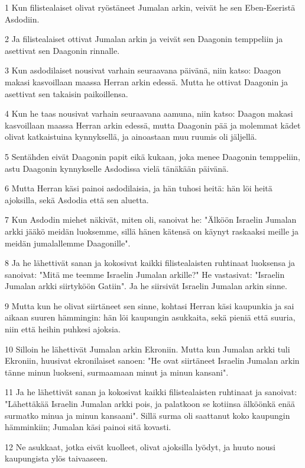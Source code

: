 \par 1 Kun filistealaiset olivat ryöstäneet Jumalan arkin, veivät he sen Eben-Eseristä Asdodiin.
\par 2 Ja filistealaiset ottivat Jumalan arkin ja veivät sen Daagonin temppeliin ja asettivat sen Daagonin rinnalle.
\par 3 Kun asdodilaiset nousivat varhain seuraavana päivänä, niin katso: Daagon makasi kasvoillaan maassa Herran arkin edessä. Mutta he ottivat Daagonin ja asettivat sen takaisin paikoillensa.
\par 4 Kun he taas nousivat varhain seuraavana aamuna, niin katso: Daagon makasi kasvoillaan maassa Herran arkin edessä, mutta Daagonin pää ja molemmat kädet olivat katkaistuina kynnyksellä, ja ainoastaan muu ruumis oli jäljellä.
\par 5 Sentähden eivät Daagonin papit eikä kukaan, joka menee Daagonin temppeliin, astu Daagonin kynnykselle Asdodissa vielä tänäkään päivänä.
\par 6 Mutta Herran käsi painoi asdodilaisia, ja hän tuhosi heitä: hän löi heitä ajoksilla, sekä Asdodia että sen aluetta.
\par 7 Kun Asdodin miehet näkivät, miten oli, sanoivat he: "Älköön Israelin Jumalan arkki jääkö meidän luoksemme, sillä hänen kätensä on käynyt raskaaksi meille ja meidän jumalallemme Daagonille".
\par 8 Ja he lähettivät sanan ja kokosivat kaikki filistealaisten ruhtinaat luoksensa ja sanoivat: "Mitä me teemme Israelin Jumalan arkille?" He vastasivat: "Israelin Jumalan arkki siirtyköön Gatiin". Ja he siirsivät Israelin Jumalan arkin sinne.
\par 9 Mutta kun he olivat siirtäneet sen sinne, kohtasi Herran käsi kaupunkia ja sai aikaan suuren hämmingin: hän löi kaupungin asukkaita, sekä pieniä että suuria, niin että heihin puhkesi ajoksia.
\par 10 Silloin he lähettivät Jumalan arkin Ekroniin. Mutta kun Jumalan arkki tuli Ekroniin, huusivat ekronilaiset sanoen: "He ovat siirtäneet Israelin Jumalan arkin tänne minun luokseni, surmaamaan minut ja minun kansani".
\par 11 Ja he lähettivät sanan ja kokosivat kaikki filistealaisten ruhtinaat ja sanoivat: "Lähettäkää Israelin Jumalan arkki pois, ja palatkoon se kotiinsa älköönkä enää surmatko minua ja minun kansaani". Sillä surma oli saattanut koko kaupungin hämminkiin; Jumalan käsi painoi sitä kovasti.
\par 12 Ne asukkaat, jotka eivät kuolleet, olivat ajoksilla lyödyt, ja huuto nousi kaupungista ylös taivaaseen.

